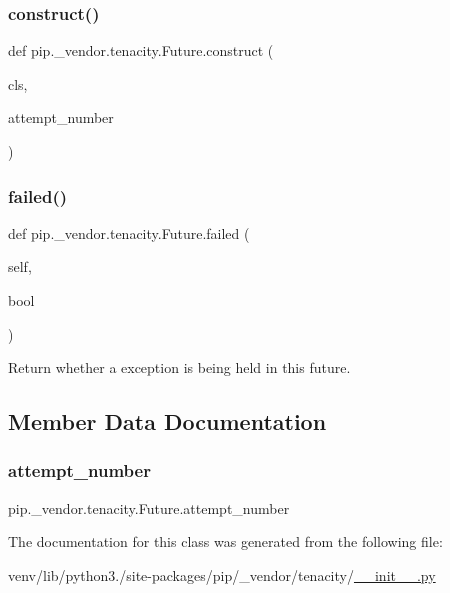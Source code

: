 \subsubsection{\texorpdfstring{construct()}{construct()}}
{\footnotesize\ttfamily def pip.\+\_\+vendor.\+tenacity.\+Future.\+construct (\begin{DoxyParamCaption}\item[{}]{cls,  }\item[{}]{attempt\+\_\+number }\end{DoxyParamCaption})}

\mbox{\label{classpip_1_1__vendor_1_1tenacity_1_1Future_a17330f1fdf2e49a7f8be503e56588856}} 
\subsubsection{\texorpdfstring{failed()}{failed()}}
{\footnotesize\ttfamily def pip.\+\_\+vendor.\+tenacity.\+Future.\+failed (\begin{DoxyParamCaption}\item[{}]{self,  }\item[{}]{bool }\end{DoxyParamCaption})}

\begin{DoxyVerb}Return whether a exception is being held in this future.\end{DoxyVerb}
 

\subsection{Member Data Documentation}
\mbox{\label{classpip_1_1__vendor_1_1tenacity_1_1Future_ab487c605320148dd8eb75eed78c456a7}} 
\subsubsection{\texorpdfstring{attempt\+\_\+number}{attempt\_number}}
{\footnotesize\ttfamily pip.\+\_\+vendor.\+tenacity.\+Future.\+attempt\+\_\+number}



The documentation for this class was generated from the following file\+:\begin{DoxyCompactItemize}
\item 
venv/lib/python3./site-\/packages/pip/\+\_\+vendor/tenacity/\hyperlink{venv_2lib_2python3_89_2site-packages_2pip_2__vendor_2tenacity_2____init_____8py}{\+\_\+\+\_\+init\+\_\+\+\_\+.\+py}\end{DoxyCompactItemize}
